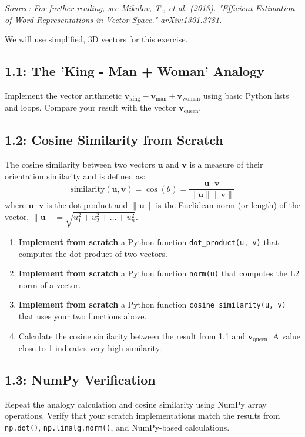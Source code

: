 \documentclass[12pt]{article}
\begin{document}
\vspace{1em}
\textit{Source: For further reading, see Mikolov, T., et al. (2013). "Efficient Estimation of Word Representations in Vector Space." arXiv:1301.3781.}
\vspace{1em}

We will use simplified, 3D vectors for this exercise.

\subsection*{1.1: The 'King - Man + Woman' Analogy}
Implement the vector arithmetic $\mathbf{v}_{\text{king}} - \mathbf{v}_{\text{man}} + \mathbf{v}_{\text{woman}}$ using basic Python lists and loops. Compare your result with the vector $\mathbf{v}_{\text{queen}}$.

\subsection*{1.2: Cosine Similarity from Scratch}
The cosine similarity between two vectors $\mathbf{u}$ and $\mathbf{v}$ is a measure of their orientation similarity and is defined as:
$$ \text{similarity}(\mathbf{u}, \mathbf{v}) = \cos(\theta) = \frac{\mathbf{u} \cdot \mathbf{v}}{\|\mathbf{u}\| \|\mathbf{v}\|} $$
where $\mathbf{u} \cdot \mathbf{v}$ is the dot product and $\|\mathbf{u}\|$ is the Euclidean norm (or length) of the vector, $\|\mathbf{u}\| = \sqrt{u_1^2 + u_2^2 + \dots + u_n^2}$.

\begin{enumerate}
    \item \textbf{Implement from scratch} a Python function \texttt{dot\_product(u, v)} that computes the dot product of two vectors.
    \item \textbf{Implement from scratch} a Python function \texttt{norm(u)} that computes the L2 norm of a vector.
    \item \textbf{Implement from scratch} a Python function \texttt{cosine\_similarity(u, v)} that uses your two functions above.
    \item Calculate the cosine similarity between the result from 1.1 and $\mathbf{v}_{\text{queen}}$. A value close to 1 indicates very high similarity.
\end{enumerate}

\subsection*{1.3: NumPy Verification}
Repeat the analogy calculation and cosine similarity using NumPy array operations. Verify that your scratch implementations match the results from \texttt{np.dot()}, \texttt{np.linalg.norm()}, and NumPy-based calculations.
\end{document}
